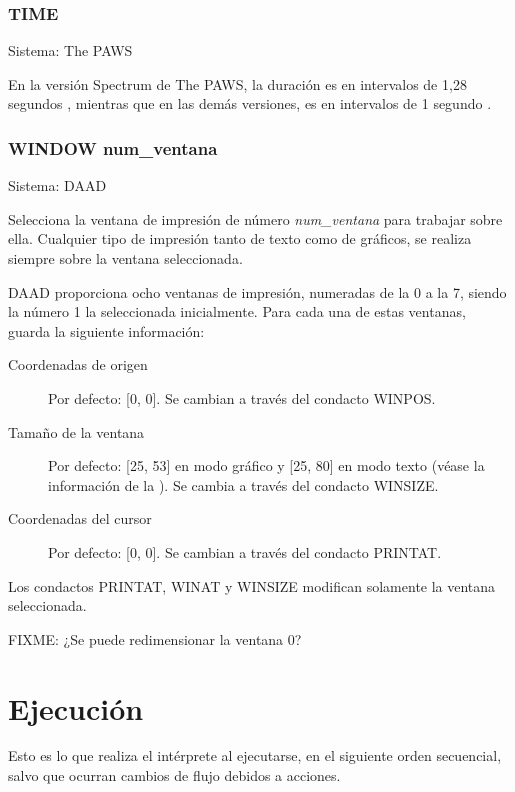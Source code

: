 \documentclass[11pt, a5paper]{article}
\newcommand{\paw}{\textsf{The PAWS}\xspace}
\newcommand{\daad}{\textsf{DAAD}\xspace}
\newcommand{\sistema}[1]{\noindent Sistema: #1 \nopagebreak}
\begin{document}
\subsubsection{TIME}

\sistema{\paw}

En la versión Spectrum de \paw, la duración es en intervalos de 1,28 segundos \cite{PawsZX}, mientras que en las demás versiones, es en intervalos de 1 segundo \cite{PawsPC}.

\subsubsection{WINDOW num\_ventana}

\sistema{\daad}

Selecciona la ventana de impresión de número \emph{num\_ventana} para trabajar sobre ella. Cualquier tipo de impresión tanto de texto como de gráficos, se realiza siempre sobre la ventana seleccionada.

\daad proporciona ocho ventanas de impresión, numeradas de la 0 a la 7, siendo la número 1 la seleccionada inicialmente. Para cada una de estas ventanas, guarda la siguiente información:

\begin{description}
  \item[Coordenadas de origen] Por defecto: [0, 0]. Se cambian a través del condacto WINPOS.

  \item[Tamaño de la ventana] Por defecto: [25, 53] en modo gráfico y [25, 80] en modo texto (véase la información de la \textbf{}). Se cambia a través del condacto WINSIZE.

  \item[Coordenadas del cursor] Por defecto: [0, 0]. Se cambian a través del condacto PRINTAT.
\end{description}

Los condactos PRINTAT, WINAT y WINSIZE modifican solamente la ventana seleccionada.

FIXME: ¿Se puede redimensionar la ventana 0?


\section{Ejecución}

Esto es lo que realiza el intérprete al ejecutarse, en el siguiente orden secuencial, salvo que ocurran cambios de flujo debidos a acciones.
\end{document}
